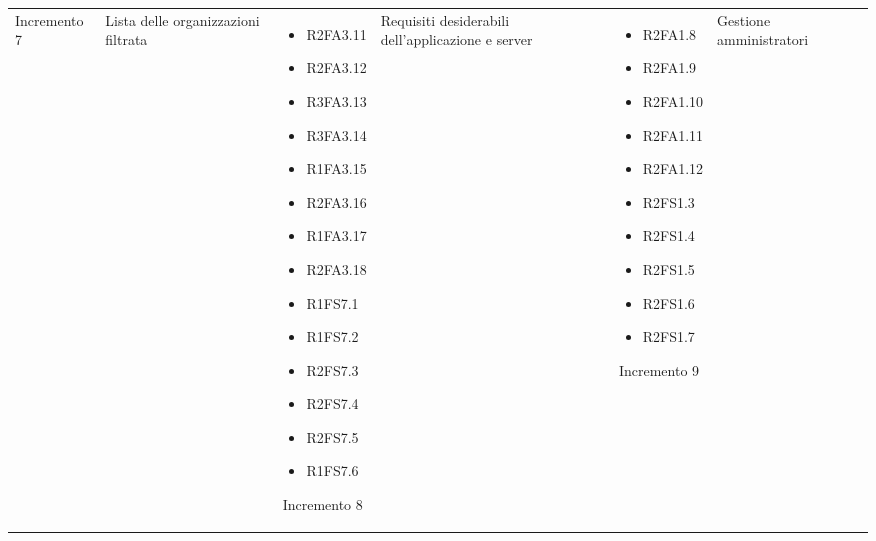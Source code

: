 {\begin{longtable}{C{4cm} C{6cm} C{4cm}}
Incremento 7 & Lista delle organizzazioni filtrata & \begin{itemize}
    \item[ ] R2FA3.11
    \item[ ] R2FA3.12
    \item[ ] R3FA3.13
    \item[ ] R3FA3.14
    \item[ ] R1FA3.15
    \item[ ] R2FA3.16
    \item[ ] R1FA3.17
    \item[ ] R2FA3.18
    \item[ ] R1FS7.1
    \item[ ] R1FS7.2
    \item[ ] R2FS7.3
    \item[ ] R2FS7.4
    \item[ ] R2FS7.5
    \item[ ] R1FS7.6
\end{itemize}

Incremento 8 & Requisiti desiderabili dell'applicazione e server & \begin{itemize}
    \item[ ] R2FA1.8
    \item[ ] R2FA1.9
    \item[ ] R2FA1.10
    \item[ ] R2FA1.11
    \item[ ] R2FA1.12
    \item[ ] R2FS1.3
    \item[ ] R2FS1.4
    \item[ ] R2FS1.5
    \item[ ] R2FS1.6
    \item[ ] R2FS1.7
\end{itemize}

Incremento 9 & Gestione amministratori & \begin{itemize}


\end{itemize}
\end{longtable}}
